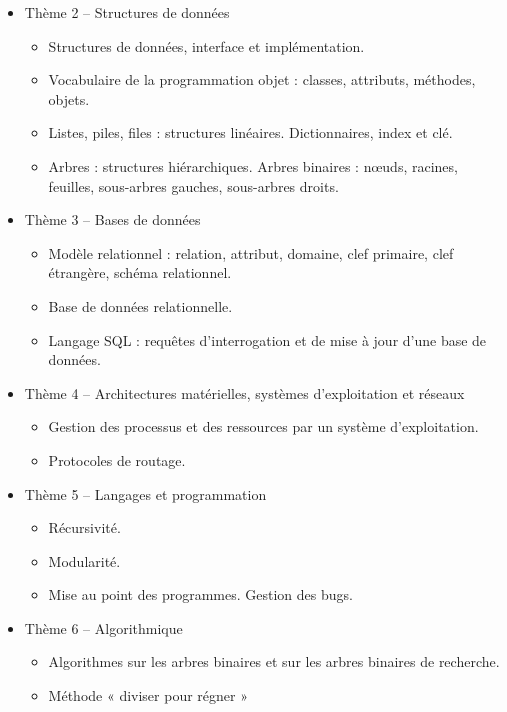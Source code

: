 \documentclass[
  a4paper,
  DIV=11,
  numbers=noendperiod]{scrartcl}
\providecommand{\tightlist}{%
  \setlength{\itemsep}{0pt}\setlength{\parskip}{0pt}}\usepackage{longtable,booktabs,array}
\begin{document}
\begin{itemize}
\item
  Thème 2 -- Structures de données

  \begin{itemize}
  \tightlist
  \item
    Structures de données, interface et implémentation.
  \item
    Vocabulaire de la programmation objet : classes, attributs,
    méthodes, objets.
  \item
    Listes, piles, files : structures linéaires. Dictionnaires, index et
    clé.
  \item
    Arbres : structures hiérarchiques. Arbres binaires : nœuds, racines,
    feuilles, sous-arbres gauches, sous-arbres droits.
  \end{itemize}
\item
  Thème 3 -- Bases de données

  \begin{itemize}
  \tightlist
  \item
    Modèle relationnel : relation, attribut, domaine, clef primaire,
    clef étrangère, schéma relationnel.
  \item
    Base de données relationnelle.
  \item
    Langage SQL : requêtes d'interrogation et de mise à jour d'une base
    de données.
  \end{itemize}
\item
  Thème 4 -- Architectures matérielles, systèmes d'exploitation et
  réseaux

  \begin{itemize}
  \tightlist
  \item
    Gestion des processus et des ressources par un système
    d'exploitation.
  \item
    Protocoles de routage.
  \end{itemize}
\item
  Thème 5 -- Langages et programmation

  \begin{itemize}
  \tightlist
  \item
    Récursivité.
  \item
    Modularité.
  \item
    Mise au point des programmes. Gestion des bugs.
  \end{itemize}
\item
  Thème 6 -- Algorithmique

  \begin{itemize}
  \tightlist
  \item
    Algorithmes sur les arbres binaires et sur les arbres binaires de
    recherche.
  \item
    Méthode « diviser pour régner »
  \end{itemize}
\end{itemize}
\end{document}
